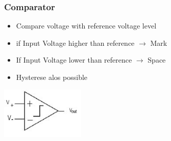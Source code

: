 \subsubsection{Comparator}
\begin{minipage}{12cm}
	\begin{itemize}
		\item Compare voltage with reference voltage level
		\item if Input Voltage higher than reference $\rightarrow$ Mark
		\item If Input Voltage lower than reference $\rightarrow$ Space
		\item Hysterese alos possible
	\end{itemize}
\end{minipage}
\begin{minipage}{4cm}
	\includegraphics[width=4cm]{images/comparator.jpg}
\end{minipage}
